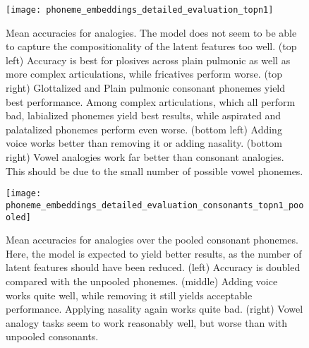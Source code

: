 \documentclass[6pt]{article}
\begin{document}
\begin{figure}[] %
   \centering
   \texttt{[image: phoneme\_embeddings\_detailed\_evaluation\_topn1]} 
   \caption{Mean accuracies for analogies. The model does not seem to be able to capture the compositionality of the latent features too well. (top left) Accuracy is best for plosives across plain pulmonic as well as more complex articulations, while fricatives perform worse. (top right) Glottalized and Plain pulmonic consonant phonemes yield best performance. Among complex articulations, which all perform bad,  labialized phonemes yield best results, while aspirated and palatalized phonemes perform even worse. (bottom left) Adding voice works better than removing it or adding nasality. (bottom right) Vowel analogies work far better than consonant analogies. This should be due to the small number of possible vowel phonemes.}
   \label{fig:phoneme_embeddings_detailed_evaluation_topn1}
\end{figure}

\begin{figure}[] %
   \centering
   \texttt{[image: phoneme\_embeddings\_detailed\_evaluation\_consonants\_topn1\_poooled]} 
   \caption{Mean accuracies for analogies over the pooled consonant phonemes. Here, the model is expected to yield better results, as the number of latent features should have been reduced. (left) Accuracy is doubled compared with the unpooled phonemes. (middle) Adding voice works quite well, while removing it still yields acceptable performance. Applying nasality again works quite bad. (right) Vowel analogy tasks seem to work reasonably well, but worse than with unpooled consonants.}
   \label{fig:phoneme_embeddings_detailed_evaluation_topn1_poooled}
\end{figure}
\end{document}
